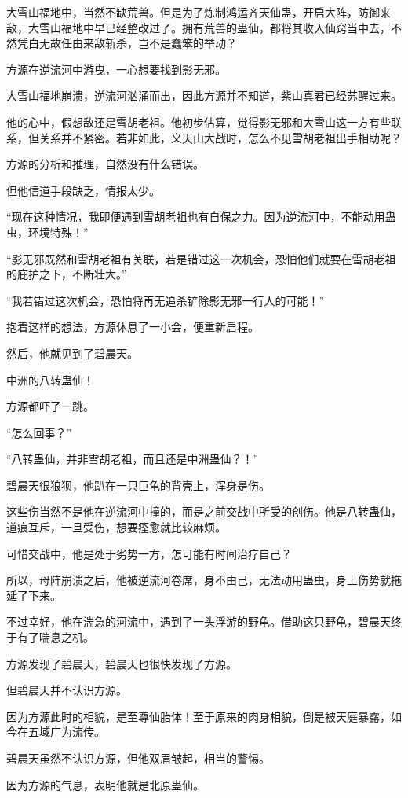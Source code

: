 \begin{this_body}
大雪山福地中，当然不缺荒兽。但是为了炼制鸿运齐天仙蛊，开启大阵，防御来敌，大雪山福地中早已经整改过了。拥有荒兽的蛊仙，都将其收入仙窍当中去，不然凭白无故任由来敌斩杀，岂不是蠢笨的举动？

方源在逆流河中游曳，一心想要找到影无邪。

大雪山福地崩溃，逆流河汹涌而出，因此方源并不知道，紫山真君已经苏醒过来。

他的心中，假想敌还是雪胡老祖。他初步估算，觉得影无邪和大雪山这一方有些联系，但关系并不紧密。若非如此，义天山大战时，怎么不见雪胡老祖出手相助呢？

方源的分析和推理，自然没有什么错误。

但他信道手段缺乏，情报太少。

“现在这种情况，我即便遇到雪胡老祖也有自保之力。因为逆流河中，不能动用蛊虫，环境特殊！”

“影无邪既然和雪胡老祖有关联，若是错过这一次机会，恐怕他们就要在雪胡老祖的庇护之下，不断壮大。”

“我若错过这次机会，恐怕将再无追杀铲除影无邪一行人的可能！”

抱着这样的想法，方源休息了一小会，便重新启程。

然后，他就见到了碧晨天。

中洲的八转蛊仙！

方源都吓了一跳。

“怎么回事？”

“八转蛊仙，并非雪胡老祖，而且还是中洲蛊仙？！”

碧晨天很狼狈，他趴在一只巨龟的背壳上，浑身是伤。

这些伤当然不是他在逆流河中撞的，而是之前交战中所受的创伤。他是八转蛊仙，道痕互斥，一旦受伤，想要痊愈就比较麻烦。

可惜交战中，他是处于劣势一方，怎可能有时间治疗自己？

所以，母阵崩溃之后，他被逆流河卷席，身不由己，无法动用蛊虫，身上伤势就拖延了下来。

不过幸好，他在湍急的河流中，遇到了一头浮游的野龟。借助这只野龟，碧晨天终于有了喘息之机。

方源发现了碧晨天，碧晨天也很快发现了方源。

但碧晨天并不认识方源。

因为方源此时的相貌，是至尊仙胎体！至于原来的肉身相貌，倒是被天庭暴露，如今在五域广为流传。

碧晨天虽然不认识方源，但他双眉皱起，相当的警惕。

因为方源的气息，表明他就是北原蛊仙。


\end{this_body}
